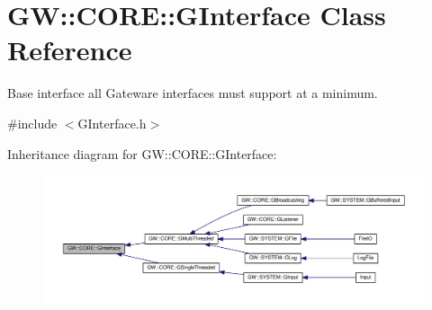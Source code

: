 \hypertarget{classGW_1_1CORE_1_1GInterface}{}\section{GW\+:\+:C\+O\+RE\+:\+:G\+Interface Class Reference}
\label{classGW_1_1CORE_1_1GInterface}


Base interface all Gateware interfaces must support at a minimum.  




{\ttfamily \#include $<$G\+Interface.\+h$>$}



Inheritance diagram for GW\+:\+:C\+O\+RE\+:\+:G\+Interface\+:\nopagebreak
\begin{figure}[H]
\begin{center}
\leavevmode
\includegraphics[width=350pt]{classGW_1_1CORE_1_1GInterface__inherit__graph}
\end{center}
\end{figure}
